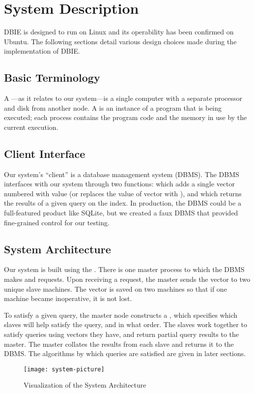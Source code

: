 \section{System Description}
DBIE is designed to run on Linux and its operability has been confirmed on
Ubuntu. The following sections detail various design choices made during the
implementation of DBIE.
%
\subsection{Basic Terminology}
A ---as it relates to our system---is a single computer with a separate
processor and disk from another node. A  is an instance of a program that is
being executed; each process contains the program code and the memory in use by
the current execution.

\subsection{Client Interface}
Our system's ``client'' is a database management system (DBMS). The DBMS
interfaces with our system through two functions:  which adds a single
vector numbered  with value  (or replaces the value of vector 
with ), and  which returns the
results of a given query  on the index. In production, the DBMS could be a
full-featured product like SQLite, but we created a faux DBMS that provided
fine-grained control for our testing.
%
\subsection{System Architecture}
Our system is built using the . There is one
master process to which the DBMS makes  and  requests.
Upon receiving a  request, the master sends the vector to
two unique slave machines. The vector is saved on two machines so that if
one machine became inoperative, it is not lost.
\par
To satisfy a given query, the master node constructs a ,
which specifies which slaves will help satisfy the query, and
in what order. The slaves work together to satisfy queries using vectors they
have, and return partial query results to the master. The master
collates the results from each slave and returns it to the DBMS.
The algorithms by which queries are satisfied are given in later sections.
%
\begin{figure}[t]
    \texttt{[image: system-picture]}
    \caption{Visualization of the System Architecture}
    \label{fig:system-visualization}
\end{figure}
%
